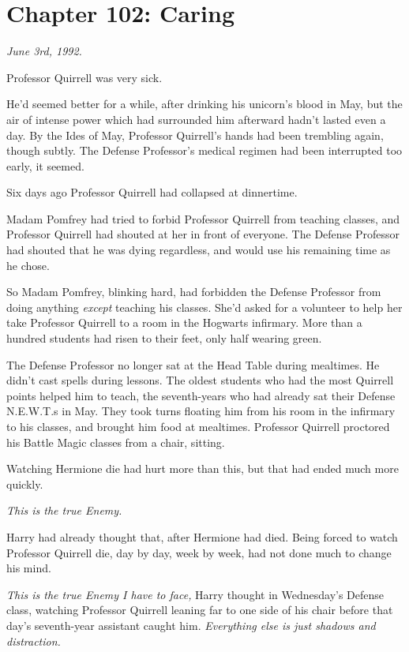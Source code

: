 \chapter{Chapter 102: Caring}
\emph{June 3rd, 1992.}

Professor Quirrell was very sick.

He'd seemed better for a while, after drinking his unicorn's blood in May, but the air of intense power which had surrounded him afterward hadn't lasted even a day. By the Ides of May, Professor Quirrell's hands had been trembling again, though subtly. The Defense Professor's medical regimen had been interrupted too early, it seemed.

Six days ago Professor Quirrell had collapsed at dinnertime.

Madam Pomfrey had tried to forbid Professor Quirrell from teaching classes, and Professor Quirrell had shouted at her in front of everyone. The Defense Professor had shouted that he was dying regardless, and would use his remaining time as he chose.

So Madam Pomfrey, blinking hard, had forbidden the Defense Professor from doing anything \emph{except} teaching his classes. She'd asked for a volunteer to help her take Professor Quirrell to a room in the Hogwarts infirmary. More than a hundred students had risen to their feet, only half wearing green.

The Defense Professor no longer sat at the Head Table during mealtimes. He didn't cast spells during lessons. The oldest students who had the most Quirrell points helped him to teach, the seventh-years who had already sat their Defense N.E.W.T.s in May. They took turns floating him from his room in the infirmary to his classes, and brought him food at mealtimes. Professor Quirrell proctored his Battle Magic classes from a chair, sitting.

Watching Hermione die had hurt more than this, but that had ended much more quickly.

\emph{This is the true Enemy.}

Harry had already thought that, after Hermione had died. Being forced to watch Professor Quirrell die, day by day, week by week, had not done much to change his mind.

\emph{This is the true Enemy I have to face,} Harry thought in Wednesday's Defense class, watching Professor Quirrell leaning far to one side of his chair before that day's seventh-year assistant caught him. \emph{Everything else is just shadows and distraction.}

